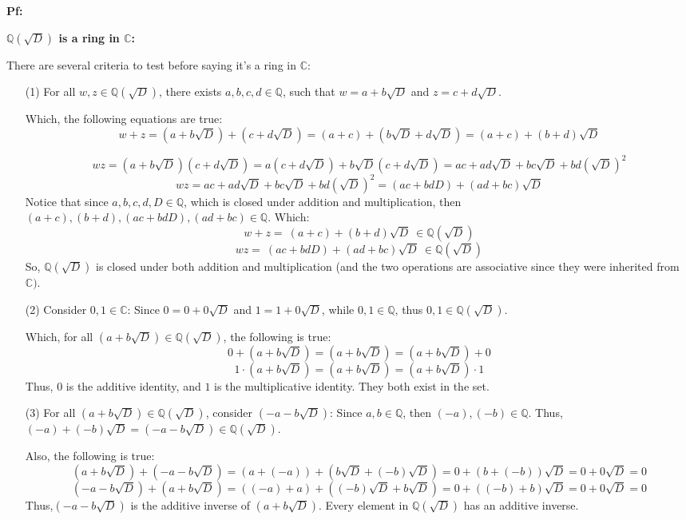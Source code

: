\documentclass{article}
\begin{document}
\textbf{Pf:}

\textbf{$\mathbb{Q}(\sqrt{D})$ is a ring in $\mathbb{C}$:}

There are several criteria to test before saying it's a ring in $\mathbb{C}$:
\begin{itemize}
    \item[(1)] For all $w,z\in \mathbb{Q}(\sqrt{D})$,
    there exists $a,b,c,d \in \mathbb{Q}$, such that $w=a+b\sqrt{D}$ and $z=c+d\sqrt{D}$.

    Which, the following equations are true:
    $$w+z=(a+b\sqrt{D})+(c+d\sqrt{D})=(a+c)+(b\sqrt{D}+d\sqrt{D}) = (a+c)+(b+d)\sqrt{D}$$

    $$wz = (a+b\sqrt{D})(c+d\sqrt{D})=a(c+d\sqrt{D})+b\sqrt{D}(c+d\sqrt{D}) = ac+ad\sqrt{D} + bc\sqrt{D}+bd(\sqrt{D})^2$$
    $$wz= ac+ad\sqrt{D} + bc\sqrt{D}+bd(\sqrt{D})^2 = (ac+bdD)+(ad+bc)\sqrt{D}$$
    Notice that since $a,b,c,d,D\in\mathbb{Q}$, which is closed under addition and multiplication, then $(a+c),(b+d),(ac+bdD),(ad+bc)\in\mathbb{Q}$.
    Which:
    $$w+z=\ (a+c)+(b+d)\sqrt{D}\  \in \mathbb{Q}(\sqrt{D})$$ 
    $$wz =\ (ac+bdD)+(ad+bc)\sqrt{D}\ \in \mathbb{Q}(\sqrt{D})$$
    So, $\mathbb{Q}(\sqrt{D})$ is closed under both addition and multiplication (and the two operations are associative since they were inherited from $\mathbb{C})$.
    
    \hfill

    \item[(2)] Consider $0,1\in\mathbb{C}$: Since $0 = 0+0\sqrt{D}$ and $1=1+0\sqrt{D}$, while $0,1\in\mathbb{Q}$, thus $0,1\in \mathbb{Q}(\sqrt{D})$.

    Which, for all $(a+b\sqrt{D})\in\mathbb{Q}(\sqrt{D})$, the following is true:
    $$0+(a+b\sqrt{D})=(a+b\sqrt{D})=(a+b\sqrt{D})+0$$
    $$1\cdot(a+b\sqrt{D})=(a+b\sqrt{D})=(a+b\sqrt{D})\cdot 1$$
    Thus, $0$ is the additive identity, and $1$ is the multiplicative identity. They both exist in the set.

    \hfill

    \item[(3)] For all $(a+b\sqrt{D})\in\mathbb{Q}(\sqrt{D})$, consider $(-a-b\sqrt{D})$:
    Since $a,b\in\mathbb{Q}$, then $(-a),(-b)\in\mathbb{Q}$. Thus, $(-a)+(-b)\sqrt{D}=(-a-b\sqrt{D})\in\mathbb{Q}(\sqrt{D})$.

    Also, the following is true:
    $$(a+b\sqrt{D}) + (-a-b\sqrt{D}) = (a+(-a))+(b\sqrt{D}+(-b)\sqrt{D}) = 0+(b+(-b))\sqrt{D} = 0+0\sqrt{D} = 0$$
    $$(-a-b\sqrt{D})+(a+b\sqrt{D}) = ((-a)+a)+((-b)\sqrt{D}+b\sqrt{D})=0+((-b)+b)\sqrt{D} = 0+0\sqrt{D}=0$$
    Thus,$(-a-b\sqrt{D})$ is the additive inverse of $(a+b\sqrt{D})$. Every element in $\mathbb{Q}(\sqrt{D})$ has an additive inverse.


\end{itemize}
\end{document}
